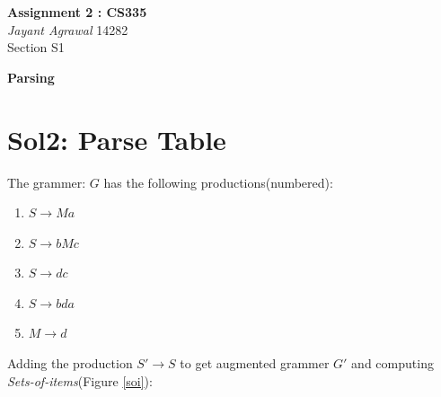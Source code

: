 \documentclass{article}
\begin{document}

\begin{center}
\textbf{\huge Assignment 2 : CS335} \\
\textit{\Large Jayant Agrawal}         14282 \\
Section S1
\end{center}

\textbf{\huge Parsing}

\section*{Sol2: Parse Table}
The grammer: $G$ has the following productions(numbered):
\begin{enumerate}
\item $S \rightarrow Ma$
\item $S \rightarrow bMc$
\item $S \rightarrow dc$
\item $S \rightarrow bda$
\item $M \rightarrow d$
\end{enumerate}
Adding the production $S' \rightarrow S$ to get augmented grammer $G'$ and computing \emph{Sets-of-items}(Figure \ref{soi}):
\end{document}
